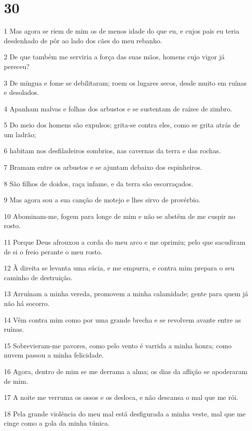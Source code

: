 \chapter{30}

\par 1 Mas agora se riem de mim os de menos idade do que eu, e cujos pais eu teria desdenhado de pôr ao lado dos cães do meu rebanho.
\par 2 De que também me serviria a força das suas mãos, homens cujo vigor já pereceu?
\par 3 De míngua e fome se debilitaram; roem os lugares secos, desde muito em ruínas e desolados.
\par 4 Apanham malvas e folhas dos arbustos e se sustentam de raízes de zimbro.
\par 5 Do meio dos homens são expulsos; grita-se contra eles, como se grita atrás de um ladrão;
\par 6 habitam nos desfiladeiros sombrios, nas cavernas da terra e das rochas.
\par 7 Bramam entre os arbustos e se ajuntam debaixo dos espinheiros.
\par 8 São filhos de doidos, raça infame, e da terra são escorraçados.
\par 9 Mas agora sou a sua canção de motejo e lhes sirvo de provérbio.
\par 10 Abominam-me, fogem para longe de mim e não se abstêm de me cuspir no rosto.
\par 11 Porque Deus afrouxou a corda do meu arco e me oprimiu; pelo que sacudiram de si o freio perante o meu rosto.
\par 12 À direita se levanta uma súcia, e me empurra, e contra mim prepara o seu caminho de destruição.
\par 13 Arruínam a minha vereda, promovem a minha calamidade; gente para quem já não há socorro.
\par 14 Vêm contra mim como por uma grande brecha e se revolvem avante entre as ruínas.
\par 15 Sobrevieram-me pavores, como pelo vento é varrida a minha honra; como nuvem passou a minha felicidade.
\par 16 Agora, dentro de mim se me derrama a alma; os dias da aflição se apoderaram de mim.
\par 17 A noite me verruma os ossos e os desloca, e não descansa o mal que me rói.
\par 18 Pela grande violência do meu mal está desfigurada a minha veste, mal que me cinge como a gola da minha túnica.
